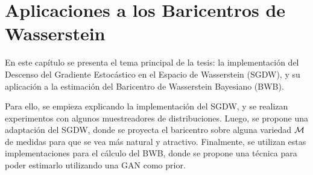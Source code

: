 \chapter{Aplicaciones a los Baricentros de Wasserstein}\label{chap:app-bar-wass}

En este capítulo se presenta el tema principal de la tesis: la implementación del Descenso del Gradiente Estocástico en el Espacio de Wasserstein (SGDW), y su aplicación a la estimación del Baricentro de Wasserstein Bayesiano (BWB).

Para ello, se empieza explicando la implementación del SGDW, y se realizan experimentos con algunos muestreadores de distribuciones. Luego, se propone una adaptación del SGDW, donde se proyecta el baricentro sobre alguna variedad $\operatorname{\mathcal{M}}$ de medidas para que se vea más natural y atractivo. Finalmente, se utilizan estas implementaciones para el cálculo del BWB, donde se propone una técnica para poder estimarlo utilizando una GAN como prior.



